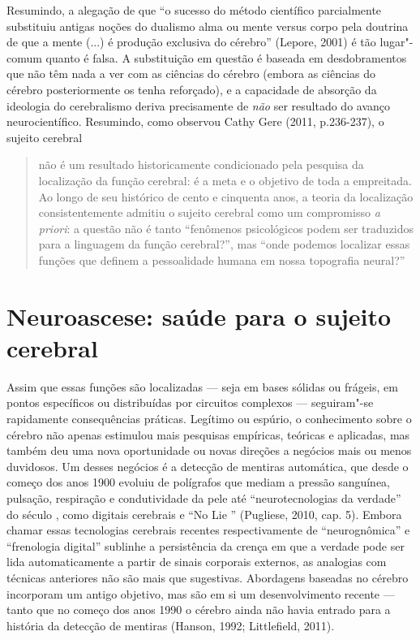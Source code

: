 Resumindo, a alegação de que ``o sucesso do método científico
parcialmente substituiu antigas noções do dualismo alma ou mente versus
corpo pela doutrina de que a mente (...) é produção exclusiva do
cérebro'' (Lepore, 2001) é tão lugar"-comum quanto é falsa. A
substituição em questão é baseada em desdobramentos que não têm nada a
ver com as ciências do cérebro (embora as ciências do cérebro
posteriormente os tenha reforçado), e a capacidade de absorção da
ideologia do cerebralismo deriva precisamente de \emph{não} ser
resultado do avanço neurocientífico. Resumindo, como observou Cathy Gere
(2011, p.236-237), o sujeito cerebral

\begin{quote}
não é um resultado historicamente condicionado pela pesquisa da
localização da função cerebral: é a meta e o objetivo de toda a
empreitada. Ao longo de seu histórico de cento e cinquenta anos, a
teoria da localização consistentemente admitiu o sujeito cerebral como
um compromisso \emph{a priori}: a questão não é tanto ``fenômenos
psicológicos podem ser traduzidos para a linguagem da função
cerebral?'', mas ``onde podemos localizar essas funções que definem a
pessoalidade humana em nossa topografia neural?''
\end{quote}

\chapter{Neuroascese: saúde para o sujeito cerebral}

Assim que essas funções são localizadas --- seja em bases sólidas ou
frágeis, em pontos específicos ou distribuídas por circuitos complexos
--- seguiram"-se rapidamente consequências práticas. Legítimo ou espúrio,
o conhecimento sobre o cérebro não apenas estimulou mais pesquisas
empíricas, teóricas e aplicadas, mas também deu uma nova oportunidade ou
novas direções a negócios mais ou menos duvidosos. Um desses negócios é
a detecção de mentiras automática, que desde o começo dos anos 1900
evoluiu de polígrafos que mediam a pressão sanguínea, pulsação,
respiração e condutividade da pele até ``neurotecnologias da verdade''
do século , como digitais cerebrais e ``No Lie '' (Pugliese, 2010,
cap. 5). Embora chamar essas tecnologias cerebrais recentes
respectivamente de ``neurognômica'' e ``frenologia digital'' sublinhe a
persistência da crença em que a verdade pode ser lida automaticamente a
partir de sinais corporais externos, as analogias com técnicas
anteriores não são mais que sugestivas. Abordagens baseadas no cérebro
incorporam um antigo objetivo, mas são em si um desenvolvimento recente
--- tanto que no começo dos anos 1990 o cérebro ainda não havia entrado
para a história da detecção de mentiras (Hanson, 1992; Littlefield,
2011).

